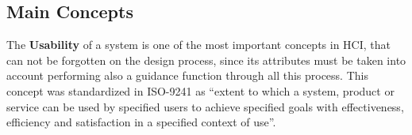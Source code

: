 



\subsection{Main Concepts}
\label{subsec:main_concepts}
The \textbf{Usability} of a system is one of the most important concepts in \gls{HCI}, that can not be forgotten on the design process, since its attributes must be taken into account performing also a guidance function through all this process. This concept was standardized in ISO-9241 \cite{iso9241-11_2018} as “extent to which a system, product or service can be used by specified users to achieve specified goals with effectiveness, efficiency and satisfaction in a specified context of use”.


